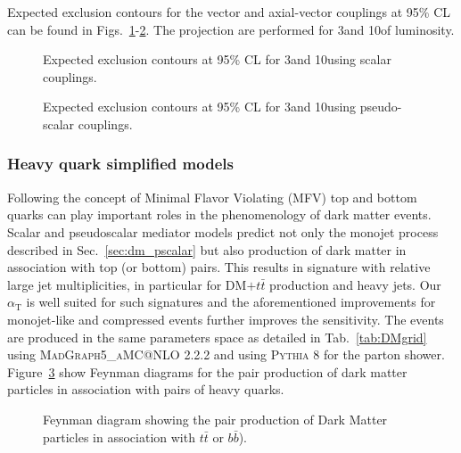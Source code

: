 Expected exclusion contours for the vector and axial-vector couplings at 95\% CL can be found in Figs.~\ref{fig:limits_S}-\ref{fig:limits_P}. The projection are performed for 3\fbinv and 10\fbinv of luminosity.


\begin{figure}[h!]
  \centering
  \caption{\label{fig:limits_S} Expected exclusion contours at 95\% CL for 3\fbinv and 10\fbinv using scalar couplings. }
\end{figure}


\begin{figure}[h!]
  \centering
  \caption{\label{fig:limits_P} Expected exclusion contours at 95\% CL for 3\fbinv and 10\fbinv using pseudo-scalar couplings. }
\end{figure}


\clearpage
\subsubsection{Heavy quark simplified models}

Following the concept of Minimal Flavor Violating (MFV) top and bottom quarks can play important roles in the phenomenology of dark matter events.
Scalar and pseudoscalar mediator models predict not only the monojet process described in Sec.~\ref{sec:dm_pscalar} but also production of dark matter in association
with top (or bottom) pairs. This results in signature with relative large jet multiplicities, in particular for DM$+t\bar{t}$ production and heavy jets. Our $\alpha_{\textrm{T}}$ is well suited for such signatures and the aforementioned improvements for monojet-like and compressed events further improves the sensitivity. The events are produced in the same parameters space as detailed in Tab.~\ref{tab:DMgrid} using \textsc{MadGraph5\_aMC@NLO} 2.2.2 and using \textsc{Pythia 8} for the parton shower. Figure~\ref{fig:feynman_hf} show Feynman diagrams for the pair production of dark matter particles in association with pairs of heavy quarks.


\begin{figure}[h!]
  \centering
  \caption{Feynman diagram showing the pair production of Dark Matter particles in association with $t\bar{t}$ or $b\bar{b}$). \cite{Abercrombie:2015wmb}}
  \label{fig:feynman_hf}
\end{figure}


